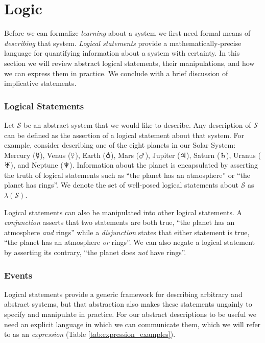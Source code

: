 \chapter{Logic}

Before we can formalize \emph{learning} about a system we first need formal 
means of \emph{describing} that system.  \emph{Logical statements} provide a
mathematically-precise language for quantifying information about a system with 
certainty.  In this section we will review abstract logical statements, their manipulations, 
and how we can express them in practice.  We conclude with a brief discussion 
of implicative statements.

\subsection{Logical Statements}

Let $\mathcal{S}$ be an abstract system that we would like to describe.
Any description of $\mathcal{S}$ can be defined as the assertion of a logical 
statement about that system.  For example, consider describing one of the 
eight planets in our Solar System: Mercury ($\mercury$), Venus ($\venus$), 
Earth ($\earth$), Mars ($\mars$), Jupiter ($\jupiter$), Saturn ($\saturn$), 
Uranus ($\uranus$), and Neptune ($\neptune$).  Information about the planet 
is encapsulated by asserting the truth of logical statements such as ``the planet 
has an atmosphere'' or ``the planet has rings''.  We denote the set of well-posed
logical statements about $\mathcal{S}$ as $\lambda \! \left( \mathcal{S} \right)$.

Logical statements can also be manipulated into other logical statements.
A \emph{conjunction} asserts that two statements are both true, ``the planet 
has an atmosphere \emph{and} rings'' while a \emph{disjunction} states that 
either statement is true, ``the planet has an atmosphere \emph{or} rings''.  
We can also negate a logical statement by asserting its contrary, ``the planet 
does \emph{not} have rings''.

\subsection{Events}

Logical statements provide a generic framework for describing arbitrary and
abstract systems, but that abstraction also makes these statements ungainly 
to specify and manipulate in practice.  For our abstract descriptions to be useful 
we need an explicit language in which we can communicate them, which we
will refer to as an \emph{expression} (Table \ref{tab:expression_examples}).

